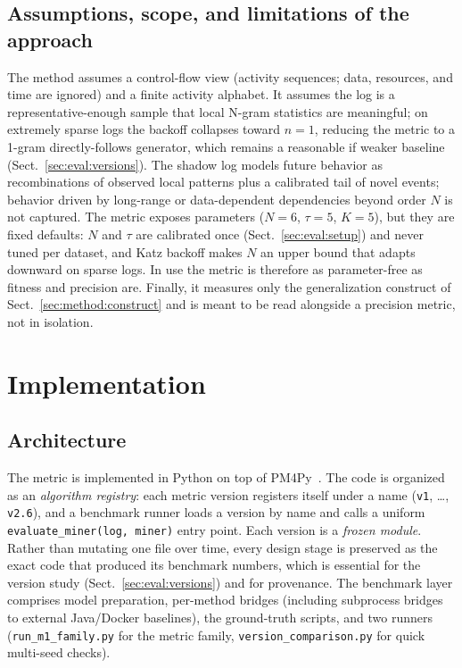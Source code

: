 \documentclass[runningheads]{llncs}
\begin{document}
\subsection{Assumptions, scope, and limitations of the approach}
\label{sec:method:scope}
The method assumes a control-flow view (activity sequences; data, resources, and time are ignored) and a finite activity alphabet. It assumes the log is a representative-enough sample that local N-gram statistics are meaningful; on extremely sparse logs the backoff collapses toward $n{=}1$, reducing the metric to a 1-gram directly-follows generator, which remains a reasonable if weaker baseline (Sect.~\ref{sec:eval:versions}). The shadow log models future behavior as recombinations of observed local patterns plus a calibrated tail of novel events; behavior driven by long-range or data-dependent dependencies beyond order $N$ is not captured. The metric exposes parameters ($N{=}6$, $\tau{=}5$, $K{=}5$), but they are fixed defaults: $N$ and $\tau$ are calibrated once (Sect.~\ref{sec:eval:setup}) and never tuned per dataset, and Katz backoff makes $N$ an upper bound that adapts downward on sparse logs. In use the metric is therefore as parameter-free as fitness and precision are. Finally, it measures only the generalization construct of Sect.~\ref{sec:method:construct} and is meant to be read alongside a precision metric, not in isolation.

\section{Implementation}
\label{sec:impl}

\subsection{Architecture}
\label{sec:impl:arch}
The metric is implemented in Python on top of PM4Py~\cite{berti2019pm4py}. The code is organized as an \emph{algorithm registry}: each metric version registers itself under a name (\texttt{v1}, \dots, \texttt{v2.6}), and a benchmark runner loads a version by name and calls a uniform \texttt{evaluate\_miner(log, miner)} entry point. Each version is a \emph{frozen module}. Rather than mutating one file over time, every design stage is preserved as the exact code that produced its benchmark numbers, which is essential for the version study (Sect.~\ref{sec:eval:versions}) and for provenance. The benchmark layer comprises model preparation, per-method bridges (including subprocess bridges to external Java/Docker baselines), the ground-truth scripts, and two runners (\texttt{run\_m1\_family.py} for the metric family, \texttt{version\_comparison.py} for quick multi-seed checks).
\end{document}
